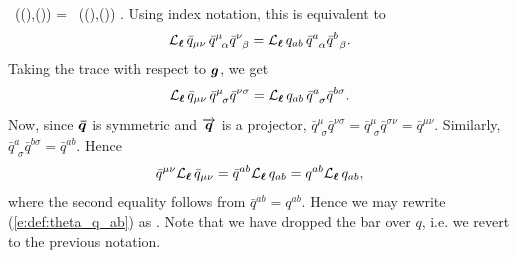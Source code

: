    \Lie{\el}  \, ((),()) =
    \Lie{\el}  \, ((),()) .
\ee
Using index notation, this is equivalent to
\[
    {\mathcal{L}}_{\bm{\ell}}\, {\bar q}_{\mu\nu} \, {\bar q}^\mu_{\ \, \alpha} {\bar q}^\nu_{\ \, \beta} =
        {\mathcal{L}}_{\bm{\ell}}\, {q}_{ab} \, {\bar q}^a_{\ \, \alpha} {\bar q}^b_{\ \, \beta} .
\]
Taking the trace with respect to $\bm{g}$, we get
\[
    \Liec{\el} {\bar q}_{\mu\nu} \, {\bar q}^\mu_{\ \, \sigma} {\bar q}^{\nu\sigma} =
        \Liec{\el} {q}_{ab} \, {\bar q}^a_{\ \, \sigma} {\bar q}^{b\sigma} .
\]
Now, since $\bm{\bar q}$ is symmetric and $\overrightarrow{\bm{q}}$ is a projector,
${\bar q}^\mu_{\ \, \sigma} {\bar q}^{\nu\sigma} = {\bar q}^\mu_{\ \, \sigma} {\bar q}^{\sigma\nu}
 = {\bar q}^{\mu\nu}$. Similarly, ${\bar q}^a_{\ \, \sigma} {\bar q}^{b\sigma} = {\bar q}^{ab}$.
Hence
\[
    {\bar q}^{\mu\nu} {\mathcal{L}}_{\bm{\ell}}\, {\bar q}_{\mu\nu} = {\bar q}^{ab}  {\mathcal{L}}_{\bm{\ell}}\, {q}_{ab}
    = q^{ab}  {\mathcal{L}}_{\bm{\ell}}\, {q}_{ab} ,
\]
where the second equality follows from
${\bar q}^{ab}  = q^{ab}$.
Hence we may rewrite (\ref{e:def:theta_q_ab}) as
\be \label{e:def:theta_q_munu}
   .
\ee
Note that we have dropped the bar over $q$, i.e. we revert to the previous notation.

